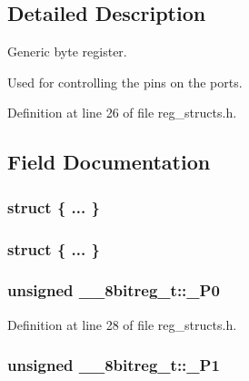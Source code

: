 \subsection{Detailed Description}
Generic byte register. 

Used for controlling the pins on the ports. 

Definition at line 26 of file reg\-\_\-structs.\-h.



\subsection{Field Documentation}
\hypertarget{union____8bitreg__t_a2eea2b1759ea7a0bd476191914f82307}{\subsubsection[{"@1}]{\setlength{\rightskip}{0pt plus 5cm}struct \{ ... \} }}\label{union____8bitreg__t_a2eea2b1759ea7a0bd476191914f82307}
\hypertarget{union____8bitreg__t_ae6c0b8b99fb4ee1633d161219ca33c72}{\subsubsection[{"@3}]{\setlength{\rightskip}{0pt plus 5cm}struct \{ ... \} }}\label{union____8bitreg__t_ae6c0b8b99fb4ee1633d161219ca33c72}
\hypertarget{union____8bitreg__t_a1c9e01d434d8eb4c6a45b76dd4f1175f}{
\subsubsection[{\-\_\-\-P0}]{\setlength{\rightskip}{0pt plus 5cm}unsigned \-\_\-\-\_\-8bitreg\-\_\-t\-::\-\_\-\-P0}}\label{union____8bitreg__t_a1c9e01d434d8eb4c6a45b76dd4f1175f}


Definition at line 28 of file reg\-\_\-structs.\-h.

\hypertarget{union____8bitreg__t_a108c964a03f1123681899156b636e203}{
\subsubsection[{\-\_\-\-P1}]{\setlength{\rightskip}{0pt plus 5cm}unsigned \-\_\-\-\_\-8bitreg\-\_\-t\-::\-\_\-\-P1}}\label{union____8bitreg__t_a108c964a03f1123681899156b636e203}


